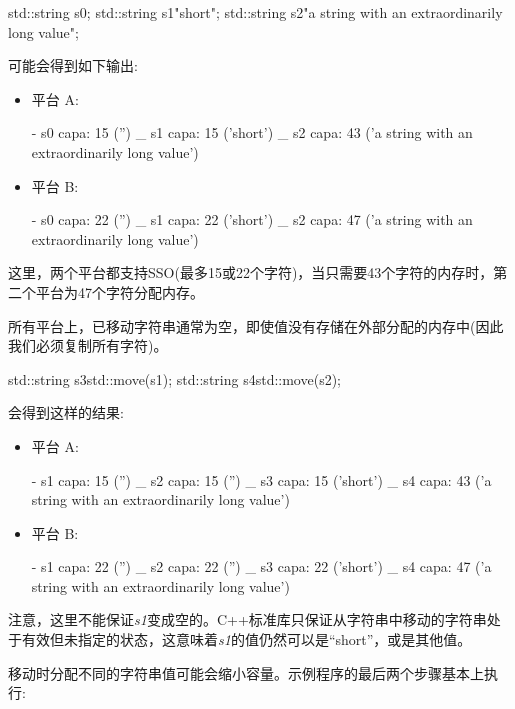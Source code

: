 \begin{cppcode}
std::string s0;
std::string s1{"short"};
std::string s2{"a string with an extraordinarily long value"};
\end{cppcode}

可能会得到如下输出:

\begin{itemize}
	\item 平台 A:
	\begin{shell}
	- s0 capa: 15 ('') _
	s1 capa: 15 ('short') _
	s2 capa: 43 ('a string with an extraordinarily long value')
	\end{shell}	
	\item 平台 B:
	\begin{shell}
	- s0 capa: 22 ('') _
	s1 capa: 22 ('short') _
	s2 capa: 47 ('a string with an extraordinarily long value')
	\end{shell}	
\end{itemize}

这里，两个平台都支持SSO(最多15或22个字符)，当只需要43个字符的内存时，第二个平台为47个字符分配内存。

所有平台上，已移动字符串通常为空，即使值没有存储在外部分配的内存中(因此我们必须复制所有字符)。

\begin{cppcode}
std::string s3{std::move(s1)};
std::string s4{std::move(s2)};
\end{cppcode}

会得到这样的结果:

\begin{itemize}
	\item 平台 A:
	\begin{shell}
	- s1 capa: 15 ('') _
	s2 capa: 15 ('') _
	s3 capa: 15 ('short') _
	s4 capa: 43 ('a string with an extraordinarily long value')
	\end{shell}	
	\item 平台 B:
	\begin{shell}
	- s1 capa: 22 ('') _
	s2 capa: 22 ('') _
	s3 capa: 22 ('short') _
	s4 capa: 47 ('a string with an extraordinarily long value')
	\end{shell}	
\end{itemize}

注意，这里不能保证\textit{s1}变成空的。C++标准库只保证从字符串中移动的字符串处于有效但未指定的状态，这意味着\textit{s1}的值仍然可以是“short”，或是其他值。

移动时分配不同的字符串值可能会缩小容量。示例程序的最后两个步骤基本上执行:

